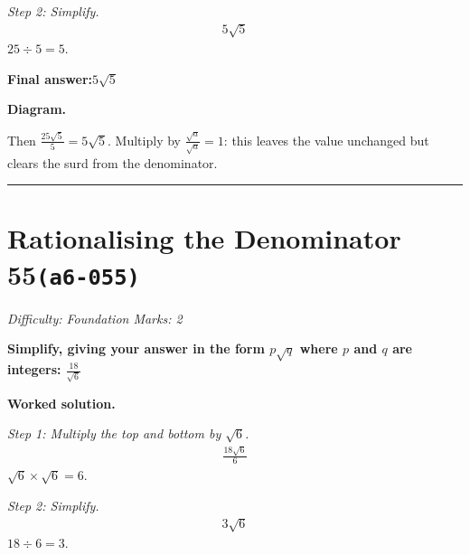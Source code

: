 \documentclass[11pt]{article}
\newcommand{\question}[1]{\par\medskip\noindent\textbf{#1}\par}
\begin{document}
\textit{Step 2: Simplify.}
\[\begin{gathered}
5\sqrt{5}
\end{gathered}\]
\( 25 \div 5 = 5 \).

\begin{answerbox}
\textbf{Final answer:}\quad \(\displaystyle 5\sqrt{5}\)
\end{answerbox}
\textbf{Diagram.}

\begin{center}
\end{center}
\small Then $\frac{25\sqrt5}{5}=5\sqrt5$. Multiply by $\frac{\sqrt{a}}{\sqrt{a}}=1$: this leaves the value unchanged but clears the surd from the denominator.\normalsize

\medskip\hrule

\section*{Rationalising the Denominator 55\quad\small\texttt{(a6-055)}}
\textit{Difficulty: Foundation \quad\textbar\quad Marks: 2}

\question{Simplify, giving your answer in the form \( p\sqrt{q} \) where \( p \) and \( q \) are integers: \( \frac{18}{\sqrt{6}} \)}

\textbf{Worked solution.}

\textit{Step 1: Multiply the top and bottom by \( \sqrt{6} \).}
\[\begin{gathered}
\frac{18\sqrt{6}}{6}
\end{gathered}\]
\( \sqrt{6} \times \sqrt{6} = 6 \).

\textit{Step 2: Simplify.}
\[\begin{gathered}
3\sqrt{6}
\end{gathered}\]
\( 18 \div 6 = 3 \).
\end{document}
